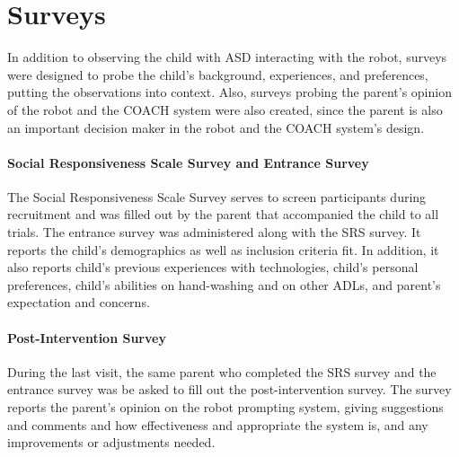 \section{Surveys}
In addition to observing the child with ASD interacting with the robot, surveys were designed to probe the child's background, experiences, and preferences, putting the observations into context.  Also, surveys probing the parent's opinion of the robot and the COACH system were also created, since the parent is also an important decision maker in the robot and the COACH system's design.

\paragraph{Social Responsiveness Scale Survey and Entrance Survey}
The Social Responsiveness Scale Survey serves to screen participants during recruitment and was filled out by the parent that accompanied the child to all trials.  The entrance survey was administered along with the SRS survey.  It reports the child's demographics as well as inclusion criteria fit.  In addition, it also reports child's previous experiences with technologies, child's personal preferences, child's abilities on hand-washing and on other ADLs, and parent's expectation and concerns.

\paragraph{Post-Intervention Survey}
During the last visit, the same parent who completed the SRS survey and the entrance survey was be asked to fill out the post-intervention survey.  The survey reports the parent's opinion on the robot prompting system, giving suggestions and comments and how effectiveness and appropriate the system is, and any improvements or adjustments needed.
